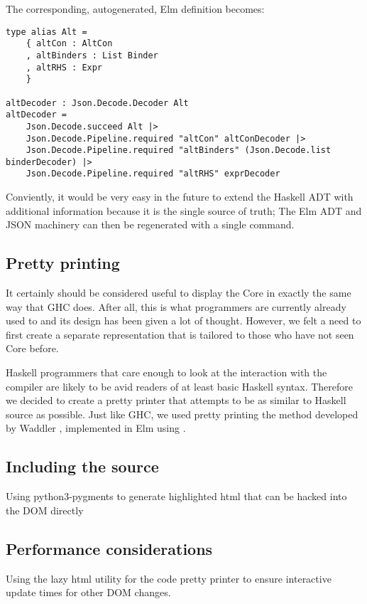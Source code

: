 The corresponding, autogenerated, Elm definition becomes:

\begin{listing}[H]
\begin{verbatim}
type alias Alt =
    { altCon : AltCon
    , altBinders : List Binder
    , altRHS : Expr
    }

altDecoder : Json.Decode.Decoder Alt
altDecoder =
    Json.Decode.succeed Alt |>
    Json.Decode.Pipeline.required "altCon" altConDecoder |>
    Json.Decode.Pipeline.required "altBinders" (Json.Decode.list binderDecoder) |>
    Json.Decode.Pipeline.required "altRHS" exprDecoder
\end{verbatim}
\end{listing}

Conviently, it would be very easy in the future to extend the Haskell ADT with additional information
because it is the single source of truth; The Elm ADT and JSON machinery can then be regenerated with a single command.

\subsection{Pretty printing}

It certainly should be considered useful to display the Core in exactly the same way that
GHC does. After all, this is what programmers are currently already used to and its design
has been given a lot of thought. However, we felt a need to first create a separate representation
that is tailored to those who have not seen Core before.

Haskell programmers that care enough to look at the interaction with the compiler are likely to be
avid readers of at least basic Haskell syntax. Therefore we decided to create a pretty printer that attempts
to be as similar to Haskell source as possible. Just like GHC, we used pretty printing the method developed 
by Waddler \cite{prettier_printer}, implemented in Elm using  \cite{prettier_printer_elm}.



\subsection{Including the source}
Using python3-pygments to generate highlighted html that can be hacked into the DOM directly

\subsection{Performance considerations}
Using the lazy html utility for the code pretty printer to ensure interactive
update times for other DOM changes.

